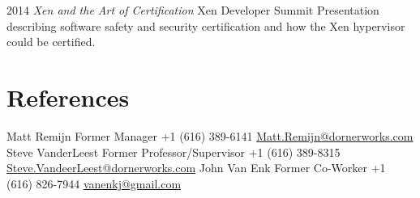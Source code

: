 \documentclass[print]{template/friggeri-cv} %
\begin{document}
\begin{entrylist}
\entry
{2014}
{\emph{Xen and the Art of Certification}}
{Xen Developer Summit}
{Presentation describing software safety and security certification and how the Xen hypervisor could be certified.}
\end{entrylist}

\section{References}

\begin{entrylist}
\nodateentry
{Matt Remijn}
{Former Manager}
{+1 (616) 389-6141 \href{mailto:Matt.Remijn@dornerworks.com}{Matt.Remijn@dornerworks.com}}
\nodateentry
{Steve VanderLeest}
{Former Professor/Supervisor}
{+1 (616) 389-8315 \href{mailto:Steve.VanderLeest@dornerworks.com}{Steve.VandeerLeest@dornerworks.com}}
\nodateentry
{John Van Enk}
{Former Co-Worker}
{+1 (616) 826-7944 \href{mailto:vanenkj@gmail.com}{vanenkj@gmail.com}}
\end{entrylist}









\end{document}
